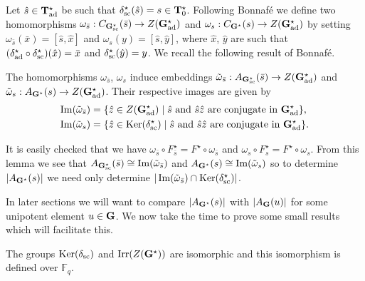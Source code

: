 \documentclass[eqthmnum]{jt-calcs}
\begin{document}
Let $\hat{s} \in \mathbf{T}_{\operatorname{ad}}^{\star}$ be such that $\delta_{\operatorname{sc}}^{\star}(\hat{s}) = s \in \mathbf{T}_0^{\star}$. Following Bonnaf\'{e} \cite[\S 2.B]{bonnafe:2005:quasi-isolated} we define two homomorphisms $\omega_{\bar{s}} : C_{\mathbf{G}_{\operatorname{sc}}^{\star}}(\bar{s}) \to Z(\mathbf{G}_{\operatorname{ad}}^{\star})$ and $\omega_s : C_{\mathbf{G}^{\star}}(s) \to Z(\mathbf{G}_{\operatorname{ad}}^{\star})$ by setting $\omega_{\bar{s}}(\bar{x}) = [\hat{s},\hat{x}]$ and $\omega_s(y) = [\hat{s},\hat{y}]$, where $\hat{x}$, $\hat{y}$ are such that $(\delta_{\operatorname{ad}}^{\star}\circ\delta_{\operatorname{sc}}^{\star})(\hat{x}) = \bar{x}$ and $\delta_{\operatorname{sc}}^{\star}(\hat{y}) = y$. We recall the following result of Bonnaf\'{e}.
\begin{lem}\label{lem:bonn-centraliser-hom}
The homomorphisms $\omega_{\bar{s}}$, $\omega_s$ induce embeddings $\tilde{\omega}_{\bar{s}} : A_{\mathbf{G}_{\operatorname{sc}}^{\star}}(\bar{s}) \to Z(\mathbf{G}_{\operatorname{ad}}^{\star})$ and $\tilde{\omega}_s : A_{\mathbf{G}^{\star}}(s) \to Z(\mathbf{G}_{\operatorname{ad}}^{\star})$. Their respective images are given by
\begin{align*}
\operatorname{Im}(\tilde{\omega}_{\bar{s}}) &= \{\hat{z} \in Z(\mathbf{G}_{\operatorname{ad}}^{\star}) \mid \hat{s}\text{ and }\hat{s}\hat{z}\text{ are conjugate in }\mathbf{G}_{\operatorname{ad}}^{\star}\},\\
\operatorname{Im}(\tilde{\omega}_s) &= \{\hat{z} \in \operatorname{Ker}(\delta_{\operatorname{sc}}^{\star}) \mid \hat{s}\text{ and }\hat{s}\hat{z}\text{ are conjugate in }\mathbf{G}_{\operatorname{ad}}^{\star}\}.
\end{align*}
\end{lem}
It is easily checked that we have $\omega_{\bar{s}}\circ F_{\bar{s}}^{\star} = F^{\star}\circ\omega_{\bar{s}}$ and $\omega_s\circ F_s^{\star} = F^{\star}\circ\omega_s$. From this lemma we see that $A_{\mathbf{G}_{\operatorname{sc}}^{\star}}(\bar{s}) \cong \operatorname{Im}(\tilde{\omega}_{\bar{s}})$ and $A_{\mathbf{G}^{\star}}(s) \cong \operatorname{Im}(\tilde{\omega}_s)$ so to determine $|A_{\mathbf{G}^{\star}}(s)|$ we need only determine $|\operatorname{Im}(\tilde{\omega}_{\bar{s}}) \cap \operatorname{Ker}(\delta_{\operatorname{sc}}^{\star})|$.

In later sections we will want to compare $|A_{\mathbf{G}^{\star}}(s)|$ with $|A_{\mathbf{G}}(u)|$ for some unipotent element $u \in \mathbf{G}$. We now take the time to prove some small results which will facilitate this.

\begin{lem}\label{lem:Z(G)-ker}
The groups $\operatorname{Ker}(\delta_{\operatorname{sc}})$ and $\operatorname{Irr}(Z(\mathbf{G}^{\star}))$ are isomorphic and this isomorphism is defined over $\mathbb{F}_q$.
\end{lem}
\end{document}
